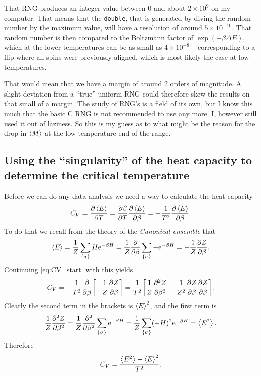 \documentclass[11pt,letter, swedish, english
]{article}
\newcommand{\DE}{\ensuremath{\Delta{E}}}
\begin{document}
That RNG produces an integer value between 0 and about $2\times10^9$
on my computer. That means that the \texttt{double}, that is generated
by diving the random number by the maximum value, will have a
resolution of around $5\times10^{-10}$. 
That random number is then compared to the Boltzmann factor of
$\exp(-\beta\DE)$, which at the lower temperatures can be as small as
$4\times10^{-8}$ -- corresponding to a flip where all spins were
previously aligned, which is most likely the case at low temperatures.  

That would mean that we have a margin of around 2 orders of magnitude.
A slight deviation from a ``true'' uniform RNG could therefore skew the
results on that small of a margin. The study of RNG's is a field of
its own, but I know this much that the basic C RNG is not recommended
to use any more. I, however still used it out of laziness. So this is
my guess as to what might be the reason for the drop in $\ev{M}$ at
the low temperature end of the range. 



\subsection{Using the ``singularity'' of the heat capacity to determine the critical temperature}
Before we can do any data analysis we need a way to calculate the heat
capacity
\begin{equation}\label{eq:CV_start}
C_V = \pdv{\ev{E}}{T} = \pdv{\beta}{T}\pdv{\ev{E}}{\beta} 
= -\frac{1}{T^2}\pdv{\ev{E}}{\beta}.
\end{equation}
To do that we recall from the theory of the 
\emph{Canonical ensemble} that 
\begin{equation}
\ev{E} = \frac{1}{Z}\sum_{\{\sigma\}} H\ee^{-\beta H}
= \frac{1}{Z} \pdv{\beta}\sum_{\{\sigma\}} -\ee^{-\beta H}
= -\frac{1}{Z} \pdv{Z}{\beta}.
\end{equation}
Continuing \eqref{eq:CV_start} with this yields
\begin{equation}
C_V = -\frac{1}{T^2}\pdv{\beta}
\qty[-\frac{1}{Z} \pdv{Z}{\beta}]
=\frac{1}{T^2}\qty[
\frac{1}{Z} \pdv[2]{Z}{\beta}
-\frac{1}{Z^2} \pdv{Z}{\beta}\pdv{Z}{\beta}].
\end{equation}
Clearly the second term in the brackets is $\ev{E}^2$, and the first
term is
\begin{equation}
\frac{1}{Z} \pdv[2]{Z}{\beta}
=\frac{1}{Z} \pdv[2]{\beta}\sum_{\{\sigma\}} \ee^{-\beta H}
=\frac{1}{Z} \sum_{\{\sigma\}} (-H)^2 \ee^{-\beta H}
= \ev{E^2}.
\end{equation}
Therefore
\begin{equation}\label{eq:CV}
C_V = \frac{\ev{E^2}-\ev{E}^2}{T^2}.
\end{equation}
\end{document}
